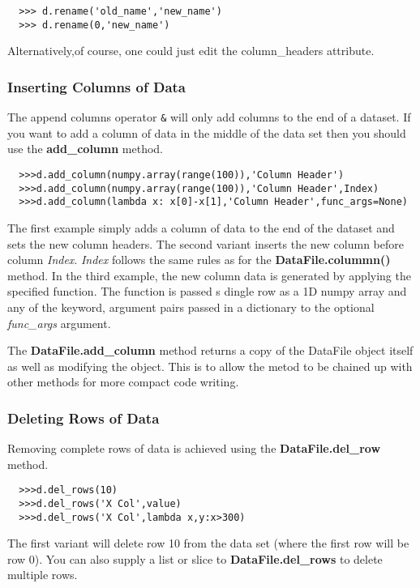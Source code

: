 \documentclass[a4paper,11pt]{scrartcl}
\begin{document}
\begin{verbatim}
  >>> d.rename('old_name','new_name')
  >>> d.rename(0,'new_name')
\end{verbatim}

Alternatively,of course, one could just edit the column\_headers attribute.

\subsubsection{Inserting Columns of Data}
The append columns operator \verb#&# will only add columns to the end of a
dataset. If you want to add a column of data in the middle of the data set then
you should use the \textbf{add\_column} method.

\begin{verbatim}
  >>>d.add_column(numpy.array(range(100)),'Column Header')
  >>>d.add_column(numpy.array(range(100)),'Column Header',Index)
  >>>d.add_column(lambda x: x[0]-x[1],'Column Header',func_args=None)
\end{verbatim}

The first example simply adds a column of data to the end of the dataset and
sets the new column headers. The second variant  inserts the new column before
column \textit{Index}. \textit{Index} follows the same rules as for the
\textbf{DataFile.colummn()} method. In the third example, the new column data is
generated by applying the specified function. The function is passed s dingle
row as a 1D numpy array and any of the keyword, argument pairs passed in a
dictionary to the optional \textit{func\_args} argument.

The \textbf{DataFile.add\_column} method returns a copy of the DataFile object
itself as well as modifying the object. This is to allow the metod to be chained
up with other methods for more compact code writing.

\subsubsection{Deleting Rows of Data}

Removing complete rows of data is achieved using the \textbf{DataFile.del\_row}
method.

\begin{verbatim}
  >>>d.del_rows(10)
  >>>d.del_rows('X Col',value)
  >>>d.del_rows('X Col',lambda x,y:x>300)
\end{verbatim}

The first variant will delete row 10 from the data set (where the first row will
be row 0). You can also supply a list or slice to \textbf{DataFile.del\_rows} to
delete multiple rows.
\end{document}
